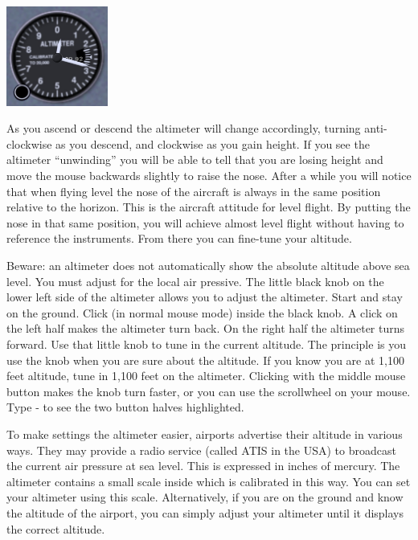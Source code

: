 \begin{center}
\includegraphics[width=0.25\textwidth]{img/tut_17}
\end{center}

As you ascend or descend the altimeter will change accordingly, turning
anti-clockwise as you descend, and clockwise as you gain height. If you see
the altimeter ``unwinding'' you will be able to tell that you are losing height
and move the mouse backwards slightly to raise the nose.
After a while you will notice that when flying level the nose of the aircraft
is always in the same position relative to the horizon. This is the aircraft
attitude for level flight. By putting the nose in that same position, you will
achieve almost level flight without having to reference the instruments. From
there you can fine-tune your altitude.

Beware: an altimeter does not automatically show the absolute altitude
above sea level. You must adjust for the local air
pressive. The little black knob on the lower left side of the
altimeter allows you to adjust the altimeter. Start
\FlightGear{} and stay on the ground. Click (in normal mouse mode) inside the
black knob. A click on the left half makes the altimeter turn back. On the
right half the altimeter turns forward. Use that little knob to tune in the
current altitude. The principle is you use the knob when you are sure about
the altitude. If you know you are at 1,100 feet altitude, tune in 1,100 feet
on the altimeter. Clicking with the middle mouse button makes the knob
turn faster, or you can use the scrollwheel on your mouse.
Type - to see the two button halves highlighted.

To make settings the altimeter easier, airports advertise their altitude in
various ways. They may provide a radio service (called ATIS in the USA)
to broadcast the current air pressure at sea level. This is expressed in
inches of mercury. The altimeter contains a small scale inside which is
calibrated in this way. You can set your altimeter using this scale.
Alternatively, if you are on the ground and know the altitude of the airport,
you can simply adjust your altimeter until it displays the correct altitude.

